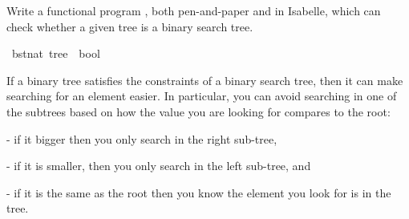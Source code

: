 \begin{isabellebody}
\begin{isamarkuptext}
    Write a functional program , both pen-and-paper and in Isabelle, which can check whether a given
    tree is a binary search tree.%
\end{isamarkuptext}\isamarkuptrue%
\isamarkupfalse%
\ bst{\isacharcolon}{\kern0pt}{\isacharcolon}{\kern0pt}{\isachardoublequoteopen}nat\ tree\ {\isasymRightarrow}\ bool{\isachardoublequoteclose}\ %
\begin{isamarkuptext}%
%
\end{isamarkuptext}\isamarkuptrue%
%
\begin{isamarkuptext}%
If a binary tree satisfies the constraints of a binary search tree, then it can make searching 
   for an element easier. In particular, you can avoid searching in one of the subtrees based on 
   how the value you are looking for compares to the root:
    
    - if it bigger then you only search in the right sub-tree,

    - if it is smaller, then you only search in the left sub-tree, and

    - if it is the same as the root then you know the element you look for is in the tree. 


\end{isamarkuptext}
\end{isabellebody}
